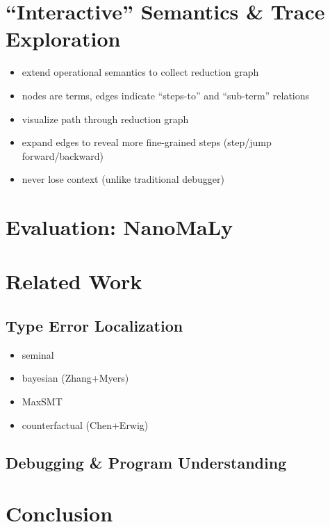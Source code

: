 \documentclass[10pt,pldi,indentedstyle=false]{sigplanconf-pldi15}
\theoremstyle{plain}%
\theoremstyle{definition}
\begin{document}
\section{``Interactive'' Semantics \& Trace Exploration} %
\begin{itemize}
\item extend operational semantics to collect reduction graph
\item nodes are terms, edges indicate ``steps-to'' and ``sub-term'' relations
\item visualize path through reduction graph
\item expand edges to reveal more fine-grained steps (step/jump forward/backward)
\item never lose context (unlike traditional debugger)
\end{itemize}

\section{Evaluation: NanoMaLy}                %
\section{Related Work}              %

\subsection{Type Error Localization}
\label{sec:type-error-local}
\begin{itemize}
\item seminal
\item bayesian (Zhang+Myers)
\item MaxSMT
\item counterfactual (Chen+Erwig)
\end{itemize}
\subsection{Debugging \& Program Understanding}
\label{sec:debugging}



\section{Conclusion}                %
\end{document}
